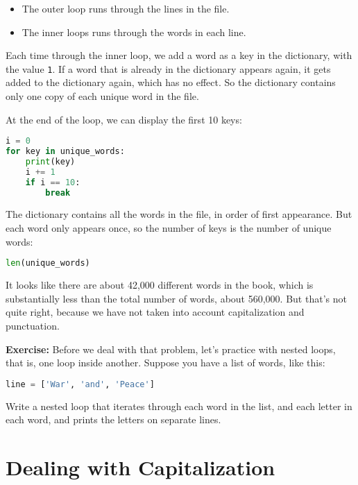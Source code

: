 \begin{itemize}
\item
  The outer loop runs through the lines in the file.
\item
  The inner loops runs through the words in each line.
\end{itemize}

Each time through the inner loop, we add a word as a key in the
dictionary, with the value \passthrough{\lstinline!1!}. If a word that
is already in the dictionary appears again, it gets added to the
dictionary again, which has no effect. So the dictionary contains only
one copy of each unique word in the file.

At the end of the loop, we can display the first 10 keys:

\begin{lstlisting}[language=Python,style=source]
i = 0
for key in unique_words:
    print(key)
    i += 1
    if i == 10:
        break
\end{lstlisting}

The dictionary contains all the words in the file, in order of first
appearance. But each word only appears once, so the number of keys is
the number of unique words:

\begin{lstlisting}[language=Python,style=source]
len(unique_words)
\end{lstlisting}

It looks like there are about 42,000 different words in the book, which
is substantially less than the total number of words, about 560,000. But
that's not quite right, because we have not taken into account
capitalization and punctuation.

\textbf{Exercise:} Before we deal with that problem, let's practice with
nested loops, that is, one loop inside another. Suppose you have a list
of words, like this:

\begin{lstlisting}[language=Python,style=source]
line = ['War', 'and', 'Peace']
\end{lstlisting}

Write a nested loop that iterates through each word in the list, and
each letter in each word, and prints the letters on separate lines.

\hypertarget{dealing-with-capitalization}{%
\section{Dealing with
Capitalization}\label{dealing-with-capitalization}}

